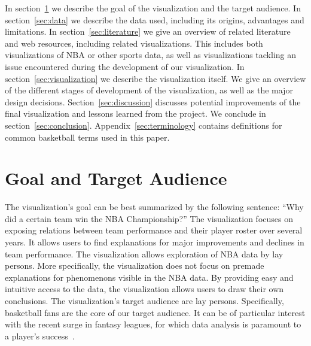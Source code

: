 \documentclass[chi_draft]{sigchi}
\begin{document}
In section~\ref{sec:goal} we describe the goal of the visualization and the
target audience. In section~\ref{sec:data} we describe the data used, including
its origins, advantages and limitations. In section~\ref{sec:literature} we give
an overview of related literature and web resources, including related
visualizations.  This includes both visualizations of NBA or other sports data,
as well as visualizations tackling an issue encountered during the development of
our visualization. In section~\ref{sec:visualization} we describe the
visualization itself. We give an overview of the different stages of development
of the visualization, as well as the major design decisions.
Section~\ref{sec:discussion} discusses potential improvements of the final
visualization and lessons learned from the project. We conclude in
section~\ref{sec:conclusion}. Appendix~\ref{sec:terminology} contains
definitions for common basketball terms used in this paper.

\section{Goal and Target Audience}\label{sec:goal} 
The visualization's goal can be best summarized by the following sentence:
``Why did a certain team win the NBA Championship?'' The visualization focuses
on exposing relations between team performance and their player roster over
several years. It allows users to find explanations for major improvements and
declines in team performance.  The visualization allows exploration of NBA data
by lay persons.  More specifically, the visualization does not focus on premade
explanations for phenomenons visible in the NBA data. By providing easy and
intuitive access to the data, the visualization allows users to draw their own
conclusions. The visualization's target audience are lay persons. Specifically,
basketball fans are the core of our target audience. It can be of particular
interest with the recent surge in fantasy leagues, for which data analysis is
paramount to a player's success~\cite{fantasy,fantasyskill}.
\end{document}
